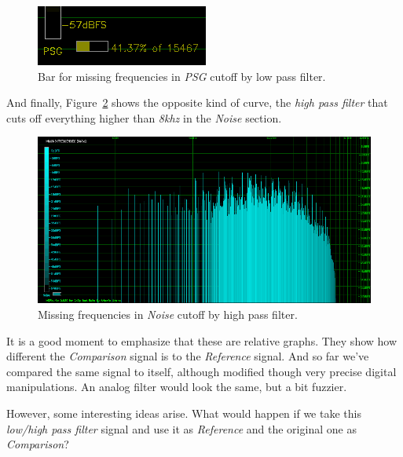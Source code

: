 \documentclass[10pt,a4paper]{report}
\newcommand{\khz}[1]{\textit{\mbox{#1\acrshort{khz}}}}
\begin{document}
\begin{figure}[H]
	\centering
	\includegraphics[width=0.4\linewidth]{images/interpretation/Plot4-5-Missing-PSG-bar.png}
	\caption[Missing PSG Bar]{Bar for missing frequencies in \textit{PSG} cutoff by low pass filter.}
	\label{fig:plot4-5-missing-psg-bars}
\end{figure}

And finally, Figure~\ref{fig:plot4-6-missing-noise} shows the opposite kind of curve, the \textit{high pass filter} that cuts off everything higher than \khz{8} in the \textit{Noise} section.

\begin{figure}[H]
	\centering
	\includegraphics[width=1.0\linewidth]{images/interpretation/Plot4-6-Missing-Noise.png}
	\caption[Missing Noise]{Missing frequencies in \textit{Noise} cutoff by high pass filter.}
	\label{fig:plot4-6-missing-noise}
\end{figure}

It is a good moment to emphasize that these are relative graphs. They show how different the \textit{Comparison} signal is to the \textit{Reference} signal. And so far we've compared the same signal to itself, although modified though very precise digital manipulations. An analog filter would look the same, but a bit fuzzier. 

However, some interesting ideas arise. What would happen if we take this \textit{low/high pass filter} signal and use it as \textit{Reference} and the original one as \textit{Comparison}?
\end{document}
